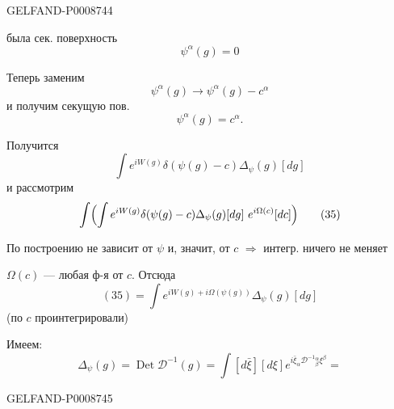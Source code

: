 \begin{GelfandAdjacentEvidence}{GELFAND-P000874}{4}


была сек. поверхность
\begin{equation*}
\psi^\alpha(g)=0
\tag{31}
\end{equation*}

Теперь заменим
\begin{equation*}
\psi^\alpha(g)\longrightarrow\psi^\alpha(g)-c^\alpha
\tag{32}
\end{equation*}
и получим секущую пов.
\begin{equation*}
\psi^\alpha(g)=c^\alpha.
\tag{33}
\end{equation*}

Получится
\begin{equation*}
\int e^{iW(g)}\delta(\psi(g)-c)\Delta_\psi(g)[dg]
\tag{34}
\end{equation*}
и рассмотрим
\begin{equation*}
\int\Bigl(\int e^{iW(g)}\delta(\psi(g)-c)\Delta_\psi(g)[dg]\ e^{i\Omega(c)}[dc]\Bigr)
\tag{35}
\end{equation*}

По построению не зависит от $\psi$ и, значит, от $c$ $\Rightarrow$ интегр. ничего не меняет

$\Omega(c)$ --- любая ф-я от $c$. Отсюда
\begin{equation*}
(35)=\int e^{iW(g)+i\Omega(\psi(g))}\Delta_\psi(g)[dg]
\tag{36}
\end{equation*}
(по $c$ проинтегрировали)

Имеем:
\begin{equation*}
\Delta_\psi(g)=\operatorname{Det}\mathcal D^{-1}(g)
=\int[d\bar\xi][d\xi]e^{i\bar\xi_\alpha\mathcal D^{-1}{}^\alpha_\beta\xi^\beta}=
\tag{37}
\end{equation*}
\end{GelfandAdjacentEvidence}
\begin{GelfandAdjacentEvidence}{GELFAND-P000874}{5}

\end{GelfandAdjacentEvidence}



